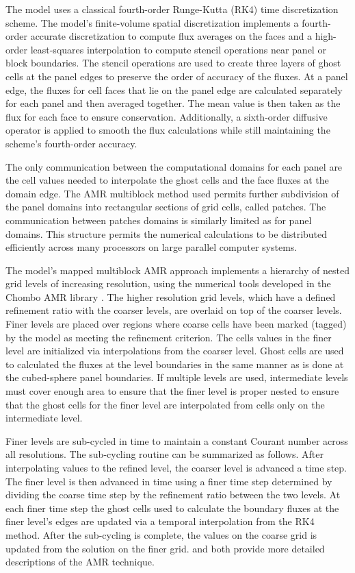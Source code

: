   The model uses a classical fourth-order Runge-Kutta (RK4) time discretization scheme. The model's finite-volume spatial discretization implements a fourth-order accurate discretization to compute flux averages on the faces and a high-order least-squares interpolation to compute stencil operations near panel or block boundaries. The stencil operations are used to create three layers of ghost cells at the panel edges to preserve the order of accuracy of the fluxes. At a panel edge, the fluxes for cell faces that lie on the panel edge are calculated separately for each panel and then averaged together. The mean value is then taken as the flux for each face to ensure conservation. Additionally, a sixth-order diffusive operator is applied to smooth the flux calculations while still maintaining the scheme's fourth-order accuracy. 
  
  The only communication between the computational domains for each panel are the cell values needed to interpolate the ghost cells and the face fluxes at the domain edge. The AMR multiblock method used permits further subdivision of the panel domains into rectangular sections of grid cells, called patches. The communication between patches domains is similarly limited as for panel domains. This structure permits the numerical calculations to be distributed efficiently across many processors on large parallel computer systems.
  
  The model's mapped multiblock AMR approach implements a hierarchy of nested grid levels of increasing resolution, using the numerical tools developed in the Chombo AMR library \citep{Adams:2015gd}. The higher resolution grid levels, which have a defined refinement ratio with the coarser levels, are overlaid on top of the coarser levels. Finer levels are placed over regions where coarse cells have been marked (tagged) by the model as meeting the refinement criterion. The cells values in the finer level are initialized via interpolations from the coarser level. Ghost cells are used to calculated the fluxes at the level boundaries in the same manner as is done at the cubed-sphere panel boundaries. If multiple levels are used, intermediate levels must cover enough area to ensure that the finer level is proper nested to ensure that the ghost cells for the finer level are interpolated from cells only on the intermediate level.  
  
  Finer levels are sub-cycled in time to maintain a constant Courant number across all resolutions. The sub-cycling routine can be summarized as follows. After interpolating values to the refined level, the coarser level is advanced a time step. The finer level is then advanced in time using a finer time step determined by dividing the coarse time step by the refinement ratio between the two levels.  At each finer time step the ghost cells used to calculate the boundary fluxes at the finer level's edges are updated via a temporal interpolation from the RK4 method. After the sub-cycling is complete, the values on the coarse grid is updated from the solution on the finer grid.  \cite{mccorquodale2015adaptive} and \cite{ferguson2016analyzing} both provide more detailed descriptions of the AMR technique. 
  
